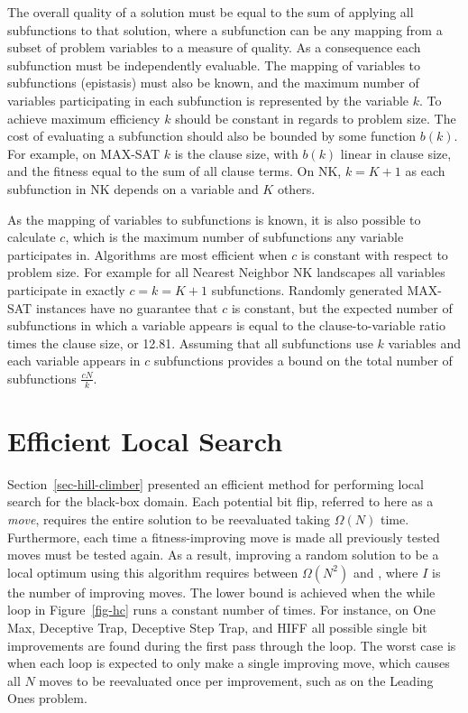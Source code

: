The overall quality of a solution must be equal to the sum of applying all subfunctions to that
solution,
where a subfunction can be any mapping from a subset of problem variables
to a measure of quality.
%
As a consequence each subfunction must be independently evaluable.
The mapping of variables to subfunctions (epistasis) must also be known, and
the maximum number of variables participating in each subfunction 
is represented by the variable $k$.
%
To achieve maximum efficiency $k$ should be constant in regards to problem size. The cost
of evaluating a subfunction should also be bounded by some function $b(k)$. For example, on MAX-SAT
$k$ is the clause size, with $b(k)$ linear in clause size, and the fitness equal to the sum of
all clause terms. On NK, $k=K+1$ as each subfunction in NK depends on a variable and $K$ others.

As the mapping of variables to subfunctions is known, it is also possible to calculate $c$, which
is the maximum number of subfunctions any variable participates in. 
Algorithms are most efficient when $c$ is constant with
respect to
problem size. For example for all Nearest Neighbor NK landscapes all variables
participate in exactly $c=k=K+1$ subfunctions. Randomly generated MAX-SAT instances have no guarantee
that $c$ is constant, but the expected number of
subfunctions in which a variable appears is equal to the clause-to-variable ratio times the clause size, or 12.81.
Assuming that all subfunctions use $k$ variables and each variable appears in $c$ subfunctions
provides a bound on the total number of subfunctions
$\frac{cN}{k}$.

\section{Efficient Local Search}
\label{sec-whitley-ls}
Section~\ref{sec-hill-climber} presented an efficient method for performing local search for the black-box
domain. Each potential bit flip, referred to here as a 
\textit{move}, requires the entire solution to be reevaluated
taking  
$\Omega(N)$ time.
Furthermore, each time a fitness-improving move is made all previously
tested moves must be tested again. As a result,
improving a random solution to be a local optimum using this algorithm requires between $\Omega(N^2)$ and , where $I$ is the number
of improving moves. The lower bound is achieved when the while loop in Figure~\ref{fig-hc} runs a constant number of times.
For instance,
on One Max, Deceptive Trap, Deceptive Step Trap, and HIFF all possible single bit improvements are found during
the first pass
through the loop. The worst case is when each loop is expected to only make a single improving move, which causes
all $N$ moves to be reevaluated once per improvement, such as on the Leading Ones problem.

